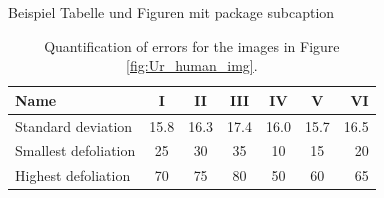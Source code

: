 \documentclass[a4paper,twoside,11pt,openright,table,draft]{article} %
\begin{document}
Beispiel Tabelle und Figuren mit package subcaption
\begin{table}[!hbt]
	\centering
	\caption{\label{tab:Ur_human_img}Quantification of errors for the images in Figure \ref{fig:Ur_human_img}.}
	\begin{tabular}{|l|c|c|c|c|c|r|}
	\hline
	Name                  & I    & II   & III  & IV   &  V   & VI   \\ \hline
	Standard deviation    & 15.8 & 16.3 & 17.4 & 16.0 & 15.7 & 16.5 \\ \hline
	Smallest defoliation  & 25   & 30   & 35   & 10   & 15   & 20   \\ \hline
	Highest defoliation   & 70   & 75   & 80   & 50   & 60   & 65   \\ \hline
	\end{tabular}
\end{table}
\end{document}
